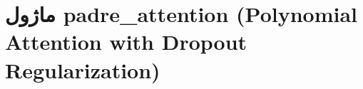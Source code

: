 \section{ماژول padre\_attention (Polynomial Attention with Dropout Regularization)}
\label{sec:module_padre_attention}

